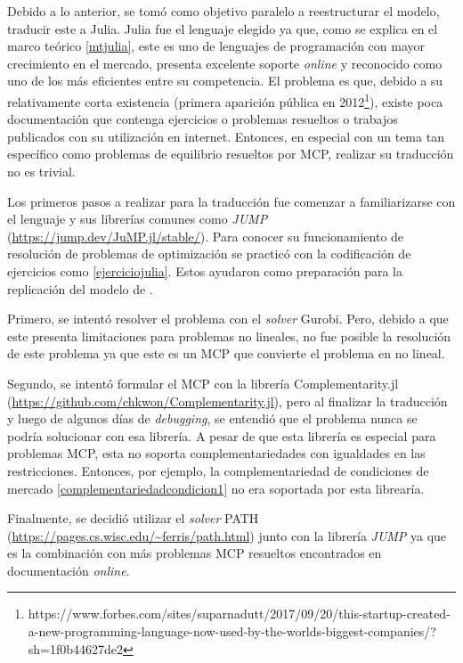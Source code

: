 Debido a lo anterior, se tomó como objetivo paralelo a reestructurar el modelo, traducir este a Julia. Julia fue el lenguaje elegido ya que, como se explica en el marco teórico \ref{mtjulia}, este es uno de lenguajes de programación con mayor crecimiento en el mercado, presenta excelente soporte \textit{online} y reconocido como uno de los más eficientes entre su competencia. El problema es que, debido a su relativamente corta existencia (primera aparición pública en 2012\footnote{https://www.forbes.com/sites/suparnadutt/2017/09/20/this-startup-created-a-new-programming-language-now-used-by-the-worlds-biggest-companies/?sh=1f0b44627de2}), existe poca documentación que contenga ejercicios o problemas resueltos o trabajos publicados con su utilización en internet. Entonces, en especial con un tema tan específico como problemas de equilibrio resueltos por MCP, realizar su traducción no es trivial.
\vspace{2.5mm}

Los primeros pasos a realizar para la traducción fue comenzar a familiarizarse con el lenguaje y sus librerías comunes como \textit{JUMP} (\url{https://jump.dev/JuMP.jl/stable/}). Para conocer su funcionamiento de resolución de problemas de optimización se practicó con la codificación de ejercicios como \ref{ejerciciojulia}. Estos ayudaron como preparación para la replicación del modelo de .
\vspace{2.5mm}

Primero, se intentó resolver el problema con el \textit{solver} Gurobi. Pero, debido a que este presenta limitaciones para problemas no lineales, no fue posible la resolución de este problema ya que este es un MCP que convierte el problema en no lineal.
\vspace{2.5mm}

Segundo, se intentó formular el MCP con la librería Complementarity.jl (\url{https://github.com/chkwon/Complementarity.jl}), pero al finalizar la traducción y luego de algunos días de \textit{debugging}, se entendió que el problema nunca se podría solucionar con esa librería. A pesar de que esta librería es especial para problemas MCP,  esta no soporta complementariedades con igualdades en las restricciones. Entonces, por ejemplo, la complementariedad de condiciones de mercado \ref{complementariedadcondicion1} no era soportada por esta librearía. 
\vspace{2.5mm}

 Finalmente, se decidió utilizar el \textit{solver} PATH (\url{https://pages.cs.wisc.edu/~ferris/path.html}) junto con la librería \textit{JUMP} ya que es la combinación con más problemas MCP resueltos encontrados en documentación \textit{online}. 
 \vspace{2.5mm}
 
